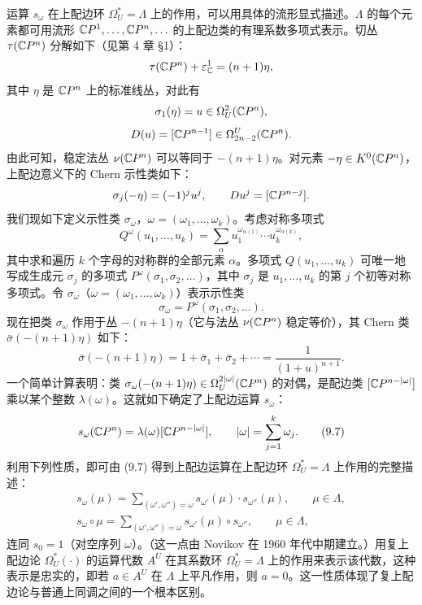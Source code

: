 运算 $s_\omega$ 在上配边环 $\Omega_U^*=\Lambda$ 上的作用，可以用具体的流形显式描述。$\Lambda$ 的每个元素都可用流形 $\mathbb{C}P^1,\ldots,\mathbb{C}P^n,\ldots$ 的上配边类的有理系数多项式表示。切丛 $\tau(\mathbb{C}P^n)$ 分解如下（见第 4 章 §1）：
\[
\tau(\mathbb{C}P^n)+\varepsilon_{\mathbb{C}}^1=(n+1)\eta,
\]
其中 $\eta$ 是 $\mathbb{C}P^n$ 上的标准线丛，对此有
\[
\sigma_1(\eta)=u\in\Omega_U^2(\mathbb{C}P^n),
\]
\[
D(u)=[\mathbb{C}P^{n-1}]\in\Omega_{2n-2}^U(\mathbb{C}P^n).
\]
由此可知，稳定法丛 $\nu(\mathbb{C}P^n)$ 可以等同于 $-(n+1)\eta$。对元素 $-\eta\in K^0(\mathbb{C}P^n)$，上配边意义下的 Chern 示性类如下：
\[
\sigma_j(-\eta)=(-1)^ju^j,\qquad Du^j=[\mathbb{C}P^{n-j}].
\]
我们现如下定义示性类 $\sigma_\omega$，$\omega=(\omega_1,\ldots,\omega_k)$。考虑对称多项式
\[
Q^\omega(u_1,\ldots,u_k)=\sum_\alpha u_1^{\omega_{\alpha(1)}}\cdots u_k^{\omega_{\alpha(k)}},
\]
其中求和遍历 $k$ 个字母的对称群的全部元素 $\alpha$。多项式 $Q(u_1,\ldots,u_k)$ 可唯一地写成生成元 $\sigma_j$ 的多项式 $P^\omega(\sigma_1,\sigma_2,\ldots)$，其中 $\sigma_j$ 是 $u_1,\ldots,u_k$ 的第 $j$ 个初等对称多项式。令 $\sigma_\omega$（$\omega=(\omega_1,\ldots,\omega_k)$）表示示性类
\[
\sigma_\omega=P^\omega(\sigma_1,\sigma_2,\ldots).
\]
现在把类 $\sigma_\omega$ 作用于丛 $-(n+1)\eta$（它与法丛 $\nu(\mathbb{C}P^n)$ 稳定等价），其 Chern 类 $\bar\sigma(-(n+1)\eta)$ 如下：
\[
\bar\sigma(-(n+1)\eta)=1+\bar\sigma_1+\bar\sigma_2+\cdots=\frac{1}{(1+u)^{n+1}}.
\]
一个简单计算表明：类 $\sigma_\omega(-(n+1)\eta)\in\Omega_U^{2|\omega|}(\mathbb{C}P^n)$ 的对偶，是配边类 $[\mathbb{C}P^{n-|\omega|}]$ 乘以某个整数 $\lambda(\omega)$。这就如下确定了上配边运算 $s_\omega$：
\begin{equation}
s_\omega(\mathbb{C}P^n)=\lambda(\omega)[\mathbb{C}P^{n-|\omega|}],\qquad |\omega|=\sum_{j=1}^k\omega_j. \tag{9.7}
\end{equation}
利用下列性质，即可由 (9.7) 得到上配边运算在上配边环 $\Omega_U^*=\Lambda$ 上作用的完整描述：
\begin{equation}
\begin{gathered}
s_\omega(\mu)=\sum_{(\omega',\omega'')=\omega}s_{\omega'}(\mu)\cdot s_{\omega''}(\mu),\qquad \mu\in\Lambda,\\
s_\omega\circ\mu=\sum_{(\omega',\omega'')=\omega}s_{\omega'}(\mu)\circ s_{\omega''},\qquad \mu\in\Lambda,
\end{gathered}\tag{9.8}
\end{equation}
连同 $s_0=1$（对空序列 $\omega$）。（这一点由 Novikov 在 1960 年代中期建立。）用复上配边论 $\Omega_U^*(\cdot)$ 的运算代数 $A^U$ 在其系数环 $\Omega_U^*=\Lambda$ 上的作用来表示该代数，这种表示是忠实的，即若 $a\in A^U$ 在 $\Lambda$ 上平凡作用，则 $a=0$。这一性质体现了复上配边论与普通上同调之间的一个根本区别。

